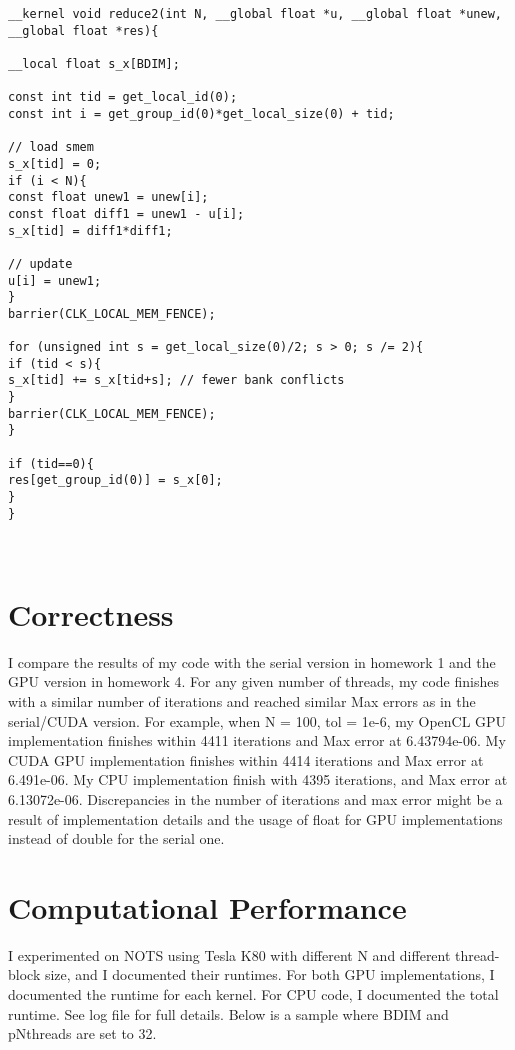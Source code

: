\documentclass{amsart} %
\begin{document}
\begin{lstlisting}
__kernel void reduce2(int N, __global float *u, __global float *unew, __global float *res){

__local float s_x[BDIM];

const int tid = get_local_id(0);
const int i = get_group_id(0)*get_local_size(0) + tid;

// load smem
s_x[tid] = 0;
if (i < N){
const float unew1 = unew[i];
const float diff1 = unew1 - u[i];
s_x[tid] = diff1*diff1;

// update
u[i] = unew1;
}
barrier(CLK_LOCAL_MEM_FENCE);

for (unsigned int s = get_local_size(0)/2; s > 0; s /= 2){
if (tid < s){
s_x[tid] += s_x[tid+s]; // fewer bank conflicts
}
barrier(CLK_LOCAL_MEM_FENCE);
}   

if (tid==0){
res[get_group_id(0)] = s_x[0];
}
}

	
\end{lstlisting}



\section{Correctness}

I compare the results of my code with the serial version in homework 1 and the GPU version in homework 4. For any given number of threads, my code finishes with a similar number of iterations and reached similar Max errors as in the serial/CUDA version. For example, when N = 100, tol = 1e-6, my OpenCL GPU implementation finishes within 4411 iterations and Max error at 6.43794e-06. My CUDA GPU implementation finishes within 4414 iterations and Max error at 6.491e-06. My CPU implementation finish with 4395 iterations, and Max error at 6.13072e-06. Discrepancies in the number of iterations and max error might be a result of implementation details and the usage of float for GPU implementations instead of double for the serial one.    



\section{Computational Performance}
I experimented on NOTS using Tesla K80 with different N and different thread-block size, and I documented their runtimes. For both GPU implementations, I documented the runtime for each kernel. For CPU code, I documented the total runtime. See log file for full details. Below is a sample where BDIM and pNthreads are set to 32.
\end{document}
